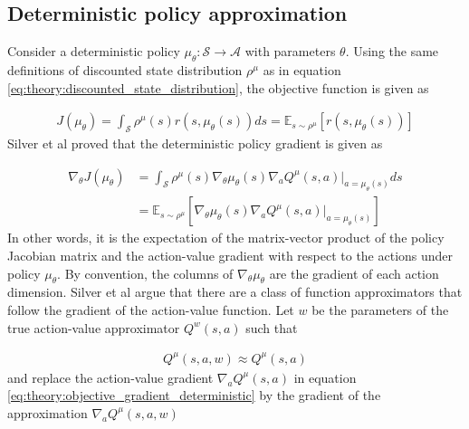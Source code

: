\documentclass[class=book, crop=false]{standalone}
\begin{document}
\subsection{Deterministic policy approximation}
Consider a deterministic policy $\mu_{\theta}: \mathcal{S} \to \mathcal{A}$ with parameters $\theta$. Using the same definitions of discounted state distribution $\rho^{\mu}$ as in equation
\eqref{eq:theory:discounted_state_distribution}, the objective function is given as 

\begin{equation}
   \begin{aligned}\label{eq:theory:objective_expected_deterministic}
    J(\mu_{\theta}) =
    \int_{\mathcal{S}}
    \rho^{\mu}(s)r(s,\mu_{\theta}(s)) ds = \mathbb{E}_{s\sim \rho^{\mu}}[r(s,\mu_{\theta}(s))]
\end{aligned} 
\end{equation}
Silver et al \cite{pmlr-v32-silver14} proved that the deterministic policy gradient is given as 

\begin{equation}
   \begin{aligned}\label{eq:theory:objective_gradient_deterministic}
    \nabla_{\theta}J(\mu_{\theta}) &=
    \int_{\mathcal{S}}
    \rho^{\mu}(s)
    \nabla_{\theta} \mu_{\theta}(s)
    \nabla_{a} Q^{\mu}(s,a)|_{a = \mu_{\theta}(s)}ds 
    \\
    &= \mathbb{E}_{s\sim \rho^{\mu}}
    [    \nabla_{\theta} \mu_{\theta}(s)
    \nabla_{a} Q^{\mu}(s,a)|_{a = \mu_{\theta}(s)}]
\end{aligned} 
\end{equation}
In other words, it is the expectation of the matrix-vector product of the policy Jacobian matrix and the action-value gradient with respect to the actions under policy $\mu_{\theta}$. By convention, the columns of $\nabla_{\theta} \mu_{\theta}$ are the gradient of each action dimension. Silver et al argue that there are a class of function approximators that follow the gradient of the action-value function. Let $w$ be the parameters of the true action-value approximator $Q^{w}(s,a)$ such that   

\begin{equation}
   \begin{aligned}\label{eq:theory:action-value_approx}
    Q^{\mu}(s,a,w) \approx Q^{\mu}(s,a)
\end{aligned} 
\end{equation}
and replace the action-value gradient $\nabla_{a} Q^{\mu}(s,a)$ in equation \eqref{eq:theory:objective_gradient_deterministic} by
the gradient of the approximation $\nabla_{a} Q^{\mu}(s,a,w)$
\end{document}
